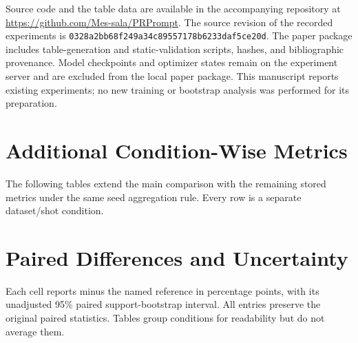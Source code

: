 Source code and the table data are available in the accompanying repository at \url{https://github.com/Mes-sala/PRPrompt}. The source revision of the recorded experiments is \texttt{0328a2bb68\allowbreak f249a34c89\allowbreak 557178b623\allowbreak 3daf5ce20d}. The paper package includes table-generation and static-validation scripts, hashes, and bibliographic provenance. Model checkpoints and optimizer states remain on the experiment server and are excluded from the local paper package. This manuscript reports existing experiments; no new training or bootstrap analysis was performed for its preparation.

\clearpage
\section{Additional Condition-Wise Metrics}
\label{app:more}
The following tables extend the main comparison with the remaining stored metrics under the same seed aggregation rule. Every row is a separate dataset/shot condition.



\clearpage
\section{Paired Differences and Uncertainty}
\label{app:paired}
Each cell reports \method{} minus the named reference in percentage points, with its unadjusted 95\% paired support-bootstrap interval. All entries preserve the original paired statistics. Tables group conditions for readability but do not average them.

